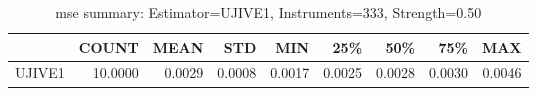 \begin{table}[ht]
\centering
\caption{mse summary: Estimator=UJIVE1, Instruments=333, Strength=0.50}
\begin{tabular}{lrrrrrrrr}
\toprule
 & COUNT & MEAN & STD & MIN & 25\% & 50\% & 75\% & MAX \\
\midrule
UJIVE1 & 10.0000 & 0.0029 & 0.0008 & 0.0017 & 0.0025 & 0.0028 & 0.0030 & 0.0046 \\
\bottomrule
\end{tabular}
\end{table}
